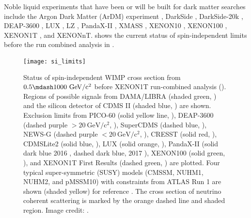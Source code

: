 Noble liquid experiments that have been or will be built for dark matter searches include the Argon Dark Matter (ArDM) experiment
, DarkSide , DarkSide-20k , DEAP-3600
, LUX , LZ ,
PandaX-II , XMASS , XENON10 , XENON100
, XENON1T , and XENONnT.   shows the
current status of spin-independent limits before the run combined analysis in .

\begin{figure}
\centering
\texttt{[image: si\_limits]}
\caption[Status of spin-independent WIMP cross section from $0.5 \mdash 1000\ \mathrm{GeV/c^2}$ before XENON1T run-combined analysis.]{Status
of spin-independent WIMP cross section from $0.5 \mdash 1000\ \mathrm{GeV/c^2}$ before XENON1T run-combined analysis
().  Regions of possible signals from DAMA/LIBRA (shaded green, ) and the silicon
detector of CDMS II (shaded blue, ) are shown.  Exclusion limits from PICO-60 (solid yellow line, ),
DEAP-3600 (dashed purple $> 20\ \mathrm{GeV/c^2}$,
), SuperCDMS (dashed blue, ), NEWS-G (dashed purple $< 20\ \mathrm{GeV/c^2}$,
), CRESST (solid red, ), CDMSLite2 (solid blue, ), LUX
(solid orange, ), PandaX-II (solid dark blue 2016
, dashed dark blue, 2017 ), XENON100 (solid green, ), and
XENON1T First Results (dashed green, ) are plotted.  Four typical super-symmetric (SUSY) models (CMSSM, NUHM1, NUHM2,
and pMSSM10) with constraints from ATLAS Run
1 are shown (shaded yellow) for reference .  The cross section of neutrino coherent scattering is marked by the
orange dashed
line and shaded region.  Image credit: .}
\label{fig:si_limits}
\end{figure}


